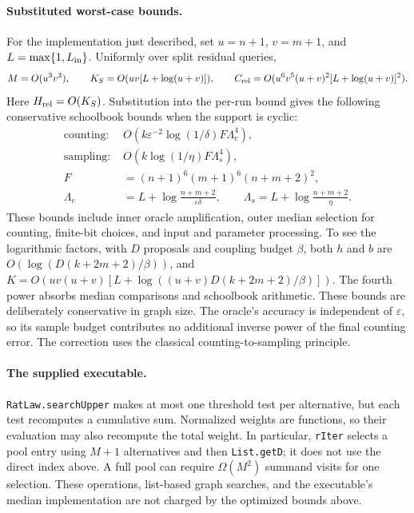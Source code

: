 \documentclass[11pt]{article}
\begin{document}
\paragraph{Substituted worst-case bounds.}
For the implementation just described, set $u=n+1$,
$v=m+1$, and $L=\max\{1,L_{\rm in}\}$. Uniformly over split residual queries,
\[
 M=O(u^3v^3),\qquad K_S=O(uv[L+\log(u+v)]),\qquad
 C_{\rm rel}=O(u^6v^5(u+v)^2[L+\log(u+v)]^2).
\]
Here $H_{\rm rel}=O(K_S)$. Substitution into the per-run bound gives the
following conservative schoolbook bounds when the support is cyclic:
\[
 \begin{aligned}
 \text{counting: }&O\!\left(k\varepsilon^{-2}\log(1/\delta)
                      F\Lambda_c^4\right),\\
 \text{sampling: }&O\!\left(k\log(1/\eta)F\Lambda_s^4\right),\\
 F&=(n+1)^6(m+1)^6(n+m+2)^2,\\
 \Lambda_c&=L+\log\frac{n+m+2}{\varepsilon\delta},\qquad
 \Lambda_s=L+\log\frac{n+m+2}{\eta}.
 \end{aligned}
\]
These bounds include inner oracle amplification, outer median selection for
counting, finite-bit choices, and input and parameter processing. To see the logarithmic factors, with $D$ proposals
and coupling budget $\beta$, both $h$ and $b$ are
$O(\log(D(k+2m+2)/\beta))$, and
$K=O(uv(u+v)[L+\log((u+v)D(k+2m+2)/\beta)])$.
The fourth power absorbs median comparisons and schoolbook arithmetic.
These bounds are deliberately conservative in graph size. The oracle's
accuracy is independent of $\varepsilon$, so its sample budget contributes
no additional inverse power of the final counting error. The correction
uses the classical counting-to-sampling principle.

\paragraph{The supplied executable.}
\texttt{RatLaw.searchUpper} makes at most one threshold test per alternative,
but each test recomputes a cumulative sum. Normalized weights are functions,
so their evaluation may also recompute the total weight. In particular,
\texttt{rIter} selects a pool entry using $M+1$ alternatives and then
\texttt{List.getD}; it does not use the direct index above. A full pool can
require $\Omega(M^2)$ summand visits for one selection. These operations,
list-based graph searches, and the executable's median implementation are
not charged by the optimized bounds above.
\end{document}
